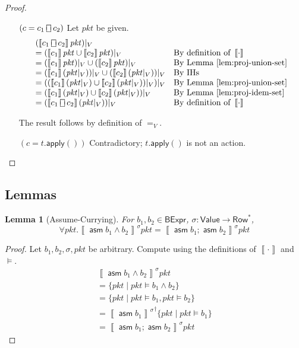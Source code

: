 \documentclass{article}
\newcommand{\pkt}{\mathit{pkt}}
\newcommand{\denote}[1]{\left\llbracket#1\right\rrbracket}
\newcommand{\Value}{\mathsf{Value}}
\newcommand{\BExpr}{\mathsf{BExpr}}
\newcommand{\Row}{\mathsf{Row}}
\newcommand{\assume}{\mathop{\mathsf{asm}}}
\newcommand{\apply}{\mathsf{apply}}
\newcommand{\choiceop}{\rotatebox[origin=c]{90}{$\sqsubset\!\!\!\sqsupset$}}
\newcommand{\choice}{\mathbin{\choiceop}}
\newtheorem{lemma}{Lemma}
\begin{document}
\begin{proof}
\begin{enumerate}[align=left]
  \item[$(c = c_1 \choice c_2)$] Let $\pkt$ be given.
    \[\begin{array}{ll}
    (\denote{c_1\choice c_2}\pkt)|_V \\
    = (\denote{c_1}\pkt \cup \denote{c_2}\pkt)|_V
    & \text{By definition of }\denote\cdot \\
    = (\denote{c_1}\pkt)|_V \cup (\denote{c_2}\pkt)|_V
    & \text{By Lemma~\ref{lem:proj-union-set}} \\
    = (\denote{c_1}(\pkt|_V))|_V \cup (\denote{c_2}(\pkt|_V))|_V
    & \text{By IHs} \\
    = ((\denote{c_1}(\pkt|_V) \cup \denote{c_2}(\pkt|_V))|_V)|_V
    & \text{By Lemma~\ref{lem:proj-union-set}} \\
    = (\denote{c_1}(\pkt|_V) \cup \denote{c_2}(\pkt|_V))|_V
    & \text{By Lemma~\ref{lem:proj-idem-set}}\\
    = (\denote{c_1 \choice c_2}(\pkt|_V))|_V
    & \text{By definition of }\denote\cdot \\
    \end{array}\]

    The result follows by definition of $=_V$.

  \item[$(c = t.\apply())$] Contradictory; $t.\apply()$ is not an action.
  \end{enumerate}

\end{proof}




\subsection{Lemmas}

\begin{lemma}[Assume-Currying]
  \label{lem:assume-currying}
  For $b_1,b_2 \in \BExpr$, $\sigma : \Value \to \Row^*$,
  \[\forall \pkt. \denote{\assume {b_1\wedge b_2}}^\sigma \pkt = \denote{\assume {b_1};\assume {b_2}}^\sigma \pkt\]
\end{lemma}
\begin{proof}
  Let $b_1,b_2,\sigma, \pkt$ be arbitrary. Compute using the definitions of $\denote\cdot$ and $\models$.
  \[\begin{array}{ll}
  \denote{\assume {b_1 \wedge b_2}}^\sigma \pkt \\
  = \{\pkt \mid \pkt \models b_1 \wedge b_2\} \\
  = \{\pkt \mid \pkt \models b_1, \pkt \models b_2\} \\
  = {\denote{\assume{b_1}}^\sigma}^\dagger\{\pkt \mid \pkt \models b_1\} \\
  = \denote{\assume{b_1}; \assume{b_2}}^\sigma \pkt
  \end{array}\]
\end{proof}
\end{document}
